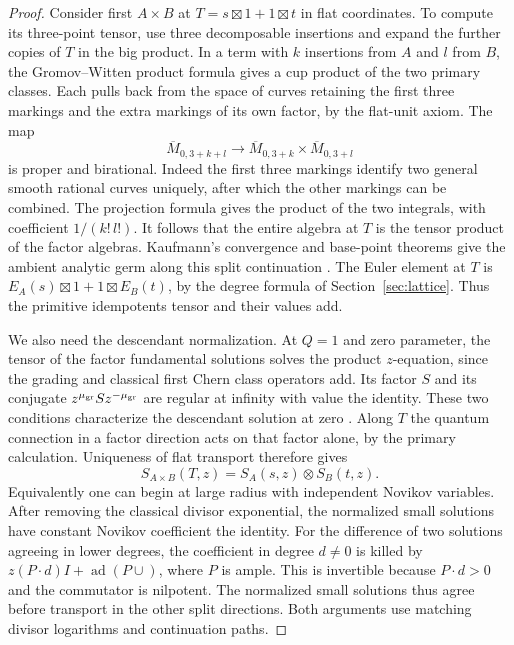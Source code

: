 \begin{proof}
Consider first $A\times B$ at $T=s\boxtimes1+1\boxtimes t$ in flat coordinates. To compute its three-point tensor, use three decomposable insertions and expand the further copies of $T$ in the big product. In a term with $k$ insertions from $A$ and $l$ from $B$, the Gromov--Witten product formula gives a cup product of the two primary classes. Each pulls back from the space of curves retaining the first three markings and the extra markings of its own factor, by the flat-unit axiom. The map
\[
  \overline M_{0,3+k+l}\longrightarrow
  \overline M_{0,3+k}\times\overline M_{0,3+l}
\]
is proper and birational. Indeed the first three markings identify two general smooth rational curves uniquely, after which the other markings can be combined. The projection formula gives the product of the two integrals, with coefficient $1/(k!\,l!)$. It follows that the entire algebra at $T$ is the tensor product of the factor algebras. Kaufmann's convergence and base-point theorems give the ambient analytic germ along this split continuation \cite[Theorem~2.2.1 and Proposition~3.3.5]{Kau}. The Euler element at $T$ is $E_A(s)\boxtimes1+1\boxtimes E_B(t)$, by the degree formula of Section~\ref{sec:lattice}. Thus the primitive idempotents tensor and their values add.

We also need the descendant normalization. At $Q=1$ and zero parameter, the tensor of the factor fundamental solutions solves the product $z$-equation, since the grading and classical first Chern class operators add. Its factor $S$ and its conjugate $z^{\mu_{\rm gr}}Sz^{-\mu_{\rm gr}}$ are regular at infinity with value the identity. These two conditions characterize the descendant solution at zero \cite[Proposition~2.3.1 and Remark~2.3.2]{GGI}. Along $T$ the quantum connection in a factor direction acts on that factor alone, by the primary calculation. Uniqueness of flat transport therefore gives
\[
                S_{A\times B}(T,z)=S_A(s,z)\otimes S_B(t,z).
\]
Equivalently one can begin at large radius with independent Novikov variables. After removing the classical divisor exponential, the normalized small solutions have constant Novikov coefficient the identity. For the difference of two solutions agreeing in lower degrees, the coefficient in degree $d\ne0$ is killed by $z(P\cdot d)I+\operatorname{ad}(P\cup)$, where $P$ is ample. This is invertible because $P\cdot d>0$ and the commutator is nilpotent. The normalized small solutions thus agree before transport in the other split directions. Both arguments use matching divisor logarithms and continuation paths.


\end{proof}
